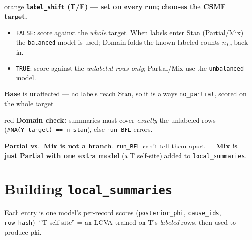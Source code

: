 \documentclass[11pt]{article}
\begin{document}
\begin{notebox}{orange}
\textbf{\texttt{label\_shift} (T/F) --- set on every run; chooses the CSMF target.}
\begin{itemize}
  \item \texttt{FALSE}: score against the \emph{whole} target. When labels enter
        Stan (Partial/Mix) the \texttt{balanced} model is used; Domain folds the
        known labeled counts $n_{Lc}$ back in.
  \item \texttt{TRUE}: score against the \emph{unlabeled rows only}; Partial/Mix
        use the \texttt{unbalanced} model.
\end{itemize}
\textbf{Base} is unaffected --- no labels reach Stan, so it is always
\texttt{no\_partial}, scored on the whole target.
\end{notebox}

\vspace{3pt}
\begin{notebox}{red}
\textbf{Domain check:} summaries must cover \emph{exactly} the unlabeled rows
(\texttt{\#NA(Y\_target) == n\_stan}), else \texttt{run\_BFL} errors.
\end{notebox}

\vspace{2pt}
\noindent\textbf{Partial vs.\ Mix is not a branch.} \texttt{run\_BFL} can't tell
them apart --- \textbf{Mix is just Partial with one extra model} (a T self-site)
added to \texttt{local\_summaries}.

\section{Building \texttt{local\_summaries}}
\label{sec:build}
Each entry is one model's per-record scores (\texttt{posterior\_phi},
\texttt{cause\_ids}, \texttt{row\_hash}). ``T self-site'' = an LCVA trained on
T's \emph{labeled} rows, then used to produce phi.
\end{document}
